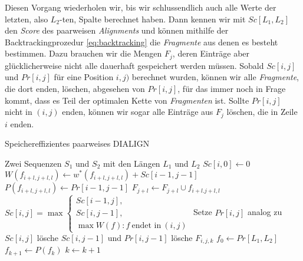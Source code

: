 Diesen Vorgang wiederholen wir, bis wir schlussendlich auch alle Werte der letzten, also $L_2$-ten, Spalte berechnet haben. Dann kennen wir mit $Sc[L_1,L_2]$ den \emph{Score} des paarweisen \emph{Alignments} und können mithilfe der Backtrackingprozedur \ref{eq:backtracking} die \emph{Fragmente} aus denen es besteht bestimmen. Dazu brauchen wir die Mengen $F_j$, deren Einträge aber glücklicherweise nicht alle dauerhaft gespeichert werden müssen. Sobald $Sc[i,j]$ und $Pr[i,j]$ für eine Position $i,j)$ berechnet wurden, können wir alle \emph{Fragmente}, die dort enden, löschen, abgesehen von $Pr[i,j]$, für das immer noch in Frage kommt, dass es Teil der optimalen Kette von \emph{Fragmenten} ist. Sollte $Pr[i,j]$ nicht in $(i,j)$ enden, können wir sogar alle Einträge aus $F_j$ löschen, die in Zeile $i$ enden.

\begin{algorithm}
	\caption{Speichereffizientes paarweises DIALIGN}
	\label{alg:speichereffizient}
	\begin{algorithmic}[1]
		
		\Require Zwei Sequenzen $S_1$ und $S_2$ mit den Längen $L_1$ und $L_2$
			\State $Sc[i,0] \gets 0$
		\EndFor
				\label{algl:fragmentgewichte}
					\State $W(f_{i+l,j+l,l}) \gets w^*(f_{i+l,j+l,l}) + Sc[i\!-\!1,j\!-\!1]$
					\State $P(f_{i+l,j+l,l}) \gets Pr[i\!-\!1,j\!-\!1]$
					\State $F_{j+l} \gets F_{j+l} \cup {f_{i+l.j+l,l}}$\label{algl:fragmentliste}
				\EndFor
				\State
					$Sc[i,j] = \max
					\begin{cases}
						Sc[i\!-\!1,j], \\
						Sc[i,j\!-\!1], \\
						\max{W(f): f\: \text{endet in}\: (i,j)}
					\end{cases}$\label{algl:praefix}
				\State Setze $Pr[i,j]$ analog zu $Sc[i,j]$
				\State lösche $Sc[i,j\!-\!1]$ und $Pr[i,j\!-\!1]$
					\State lösche $F_{i,j,k}$
				\EndFor
			\EndFor
		\EndFor
		\State $f_0 \gets Pr[L_1,L_2]$
			\State $f_{k+1} \gets P(f_{k})$
			\State $k \gets k+1$
		\EndWhile 
		\EndProcedure
	\end{algorithmic}
\end{algorithm}

